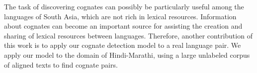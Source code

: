 \documentclass[11pt,letterpaper]{article}
\begin{document}


The task of discovering cognates can possibly be particularly useful among the languages of South Asia, which are not rich in lexical resources. Information about cognates can become an important source for assisting the creation and sharing of lexical resources between languages. Therefore, another contribution of this work is to apply our cognate detection model to a real language pair. We apply our model to the domain of Hindi-Marathi, using a large unlabeled corpus of aligned texts to find cognate pairs.




\end{document}
